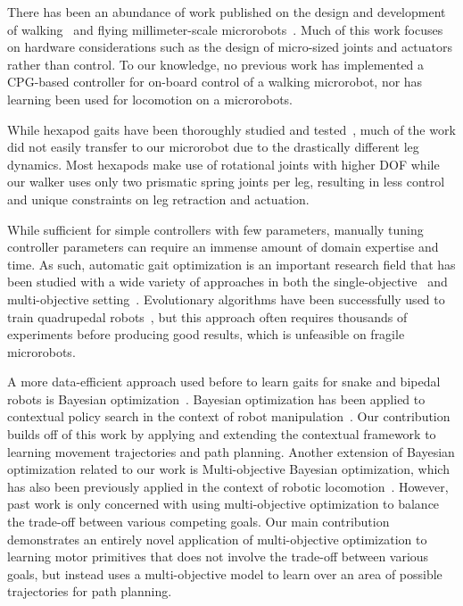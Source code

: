 There has been an abundance of work published on the design and development of walking~\citep{Ambroggi1997} and flying millimeter-scale microrobots~\citep{4457871,8001934, Kilberg2017MEMSAC}.
Much of this work focuses on hardware considerations such as the design of micro-sized joints and actuators rather than control.
To our knowledge, no previous work has implemented a CPG-based controller for on-board control of a walking microrobot, nor has learning been used for locomotion on a microrobots.

While hexapod gaits have been thoroughly studied and tested~\citep{Altendorfer2001,Hoover2008}, much of the work did not easily transfer to our microrobot due to the drastically different leg dynamics. 
Most hexapods make use of rotational joints with higher DOF while our walker uses only two prismatic spring joints per leg, resulting in less control and unique constraints on leg retraction and actuation. 

While sufficient for simple controllers with few parameters, manually tuning controller parameters can require an immense amount of domain expertise and time.
As such, automatic gait optimization is an important research field that has been studied with a wide variety of approaches in both the single-objective~\citep{Tedrake2004,Chernova2004,Niehaus2007,Lizotte2007,Tesch2011,Oliveira2011,Oliveira2013,Calandra2015a} and multi-objective setting~\citep{Capi2005,Oliveira2011,Oliveira2013,Tesch2013}.
%
Evolutionary algorithms have been successfully used to train quadrupedal robots~\citep{Chernova2004,Oliveira2011}, but this approach often requires thousands of experiments before producing good results, which is unfeasible on fragile microrobots.

A more data-efficient approach used before to learn gaits for snake and bipedal robots is Bayesian optimization~\citep{Lizotte2007,Tesch2011,Calandra2015a,Antonova2017}. 
Bayesian optimization has been applied to contextual policy search in the context of robot manipulation~\citep{Metzen2015}.
Our contribution builds off of this work by applying and extending the contextual framework to learning movement trajectories and path planning.
%
Another extension of Bayesian optimization related to our work is Multi-objective Bayesian optimization, which has also been previously applied in the context of robotic locomotion~\cite{Tesch2013}.
However, past work is only concerned with using multi-objective optimization to balance the trade-off between various competing goals.
Our main contribution demonstrates an entirely novel application of multi-objective optimization to learning motor primitives that does not involve the trade-off between various goals, but instead uses a multi-objective model to learn over an area of possible trajectories for path planning.

